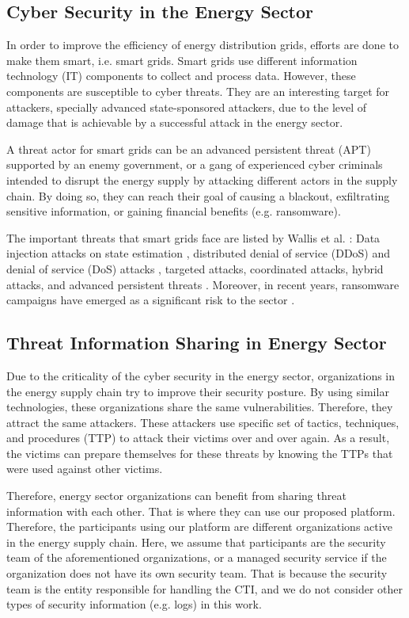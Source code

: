 \documentclass{article}
\begin{document}
\subsection{Cyber Security in the Energy Sector}
In order to improve the efficiency of energy distribution grids, efforts are done to make them smart, i.e. smart grids. Smart grids use different information technology (IT) components to collect and process data. However, these components are susceptible to cyber threats. They are an interesting target for attackers, specially advanced state-sponsored attackers, due to the level of damage that is achievable by a successful attack in the energy sector. 

A threat actor for smart grids can be an advanced persistent threat (APT) supported by an enemy government, or a gang of experienced cyber criminals intended to disrupt the energy supply by attacking different actors in the supply chain. By doing so, they can reach their goal of causing a blackout, exfiltrating sensitive information, or gaining financial benefits (e.g. ransomware). 

The important threats that smart grids face are listed by Wallis et al. \cite{wallis_ee-isacpractical_2022}: Data injection attacks on state estimation \cite{deng_false_2019}, distributed denial of service (DDoS) and denial of service (DoS) attacks \cite{wang_coordinated_2019}, targeted attacks, coordinated attacks, hybrid attacks, and advanced persistent threats \cite{leszczyna_cybersecurity_2019}. Moreover, in recent years, ransomware campaigns have emerged as a significant risk to the sector \cite{keshavarzi_i2ce3_2020}.

\subsection{Threat Information Sharing in Energy Sector}

Due to the criticality of the cyber security in the energy sector, organizations in the energy supply chain try to improve their security posture. By using similar technologies, these organizations share the same vulnerabilities. Therefore, they attract the same attackers. These attackers use specific set of tactics, techniques, and procedures (TTP) to attack their victims over and over again. As a result, the victims can prepare themselves for these threats by knowing the TTPs that were used against other victims.

Therefore, energy sector organizations can benefit from sharing threat information with each other. That is where they can use our proposed platform. Therefore, the participants using our platform are different organizations active in the energy supply chain. Here, we assume that participants are the security team of the aforementioned organizations, or a managed security service if the organization does not have its own security team. That is because the security team is the entity responsible for handling the CTI, and we do not consider other types of security information (e.g. logs) in this work.
\end{document}
